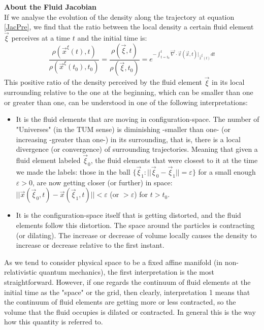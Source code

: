 \documentclass[11pt, a4paper]{article} %
\DeclareRobustCommand{\mybox}[2][gray!20]{%
\begin{tcolorbox}[   %
        left=1cm,
        right=1cm,
        top=0.5cm,
        bottom=0.5cm,
        colback=#1,
        colframe=#1,
        width=\dimexpr\textwidth\relax, 
        enlarge left by=0mm,
        boxsep=5pt,
        arc=0pt,outer arc=0pt,
        ]
        #2
\end{tcolorbox}
}
\begin{document}
\mybox{{\bf About the Fluid Jacobian\\ }
If we analyse the evolution of the density along the trajectory at equation \eqref{JacPre}, we find that the ratio between the local density a certain fluid element $\vec{\xi}$ perceives at a time $t$ and the initial time is:
\begin{equation}
\frac{\rho(\vec{x}^\xi(t),t)}{\rho(\vec{x}^\xi(t_0),t_0)}=\frac{\rho(\vec{\xi},t)}{\rho(\vec{\xi},t_0)}=e^{-\int_{t=t_0}^t \vec{\nabla}\cdot \vec{v}(\vec{x},t)\rvert_{\vec{x}^\xi(t)} dt}
\end{equation}
This positive ratio of the density perceived by the fluid element $\vec{\xi}$ in its local surrounding relative to the one at the beginning, which can be smaller than one or greater than one, can be understood in one of the following interpretations: 
\begin{itemize}
\item It is the fluid elements that are moving in configuration-space. The number of "Universes" (in the TUM sense) is diminishing -smaller than one- (or increasing -greater than one-) in its surrounding, that is, there is a local divergence (or convergence) of surrounding trajectories. Meaning that given a fluid element labeled $\vec{\xi}_0$, the fluid elements that were closest to it at the time we made the labels: those in the ball $\{\vec{\xi}_1:||\vec{\xi}_0-\vec{\xi}_1||=\varepsilon\}$  for a small enough $\varepsilon>0$, are now getting closer (or further) in space: $||\vec{x}(\vec{\xi}_0,t)-\vec{x}(\vec{\xi}_1,t)||<\varepsilon$ (or $>\varepsilon$) for $t>t_0$.
\item It is the configuration-space itself that is getting distorted, and the fluid elements follow this distortion. The space around the particles is contracting (or dilating). The increase or decrease of volume locally causes the density to increase or decrease relative to the first instant.
\end{itemize}
As we tend to consider physical space to be a fixed affine manifold (in non-relativistic quantum mechanics), the first interpretation is the most straightforward. However, if one regards the continuum of fluid elements at the initial time as the "space" or the grid, then clearly, interpretation 1 means that the continuum of fluid elements are getting more or less contracted, so the volume that the fluid occupies is dilated or contracted. In general this is the way how this quantity is referred to. \\

}
\end{document}
